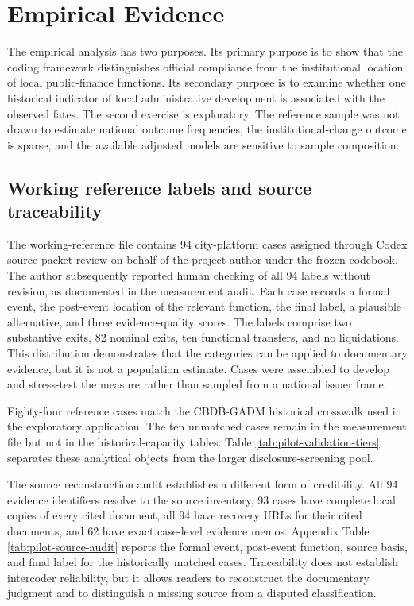 \section{Empirical Evidence}

The empirical analysis has two purposes. Its primary purpose is to show that the
coding framework distinguishes official compliance from the institutional
location of local public-finance functions. Its secondary purpose is to examine
whether one historical indicator of local administrative development is
associated with the observed fates. The second exercise is exploratory. The
reference sample was not drawn to estimate national outcome frequencies, the
institutional-change outcome is sparse, and the available adjusted models are
sensitive to sample composition.

\subsection{Working reference labels and source traceability}

The working-reference file contains 94 city-platform cases assigned through
Codex source-packet review on behalf of the project author under the frozen
codebook. The author subsequently reported human checking of all 94 labels
without revision, as documented in the measurement audit. Each case records a formal event, the
post-event location of the relevant function, the final label, a plausible
alternative, and three evidence-quality scores. The labels comprise two
substantive exits, 82 nominal exits, ten functional transfers, and no
liquidations. This distribution demonstrates that the categories can be
applied to documentary evidence, but it is not a population estimate. Cases
were assembled to develop and stress-test the measure rather than sampled from
a national issuer frame.

Eighty-four reference cases match the CBDB-GADM historical crosswalk used in
the exploratory application. The ten unmatched cases remain in the measurement
file but not in the historical-capacity tables. Table
\ref{tab:pilot-validation-tiers} separates these analytical objects from the
larger disclosure-screening pool.



The source reconstruction audit establishes a different form of credibility.
All 94 evidence identifiers resolve to the source inventory, 93 cases have
complete local copies of every cited document, all 94 have recovery URLs for
their cited documents, and 62 have exact case-level evidence memos. Appendix
Table \ref{tab:pilot-source-audit} reports the formal event, post-event function,
source basis, and final label for the historically matched cases. Traceability
does not establish intercoder reliability, but it allows readers to reconstruct
the documentary judgment and to distinguish a missing source from a disputed
classification.

